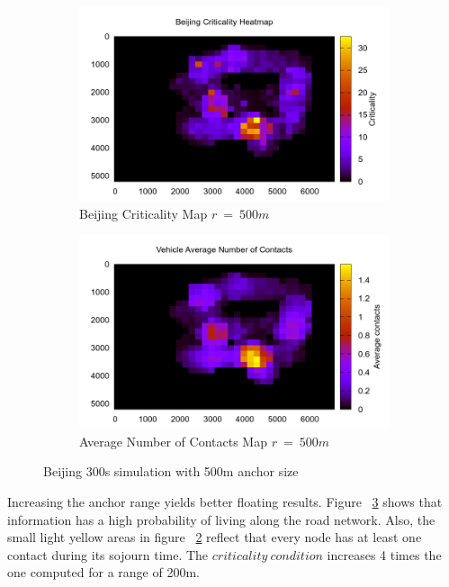 \begin{figure}[t]
	\centering
	\begin{subfigure}[t]{0.5\textwidth}
 		\includegraphics[width=\textwidth]{img/Beijing/criticality3_sim_Beijing3_300s_500m}
 		\caption{Beijing Criticality Map $r\ =\ 500m$}
 		\label{fig:Beijing_criticality_300s_500m}
 	\end{subfigure}%
 	\hfill
 	\begin{subfigure}[t]{0.5\textwidth}
 		\includegraphics[width=\textwidth]{img/Beijing/avgContacts_sim_Beijing3_300s_500m}
 		\caption{Average Number of Contacts Map $r\ =\ 500m$}
 		\label{fig:Beijing_avg_300s_500m}
 	\end{subfigure}
 	\caption{Beijing 300s simulation with 500m anchor size}
 	\label{fig:Beijing_300s_500m}
 \end{figure}
 
 Increasing the anchor range yields better floating results. Figure
 ~\ref{fig:Beijing_300s_500m} shows that information has a high probability of
 living along the road network. Also, the small light yellow areas in figure 
 ~\ref{fig:Beijing_avg_300s_500m} reflect that every node has at least one
 contact during its sojourn time. The $criticality\ condition$ increases 4 times
 the one computed for a range of 200m.
 
